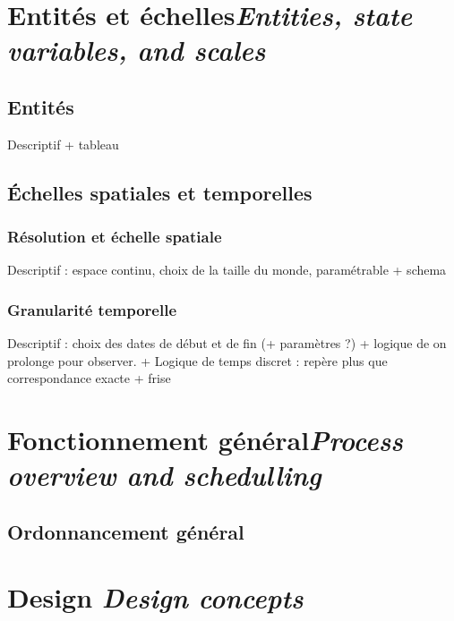 \section[Entités et échelles -- \textit{Entities, state variables, and scales}]{Entités et échelles\protect\newline \large{\textit{Entities, state variables, and scales}}}

\subsection{Entités}

Descriptif + tableau

\subsection{Échelles spatiales et temporelles}

\subsubsection{Résolution et échelle spatiale}

Descriptif : espace continu, choix de la taille du monde, paramétrable
+ schema

\subsubsection{Granularité temporelle}

Descriptif : choix des dates de début et de fin (+ paramètres ?) + logique de on prolonge pour observer. + Logique de temps discret : repère plus que correspondance exacte
+ frise

\section[Fonctionnement général -- \textit{Process overview and schedulling}]{Fonctionnement général\protect\newline \large{\textit{Process overview and schedulling}}}

\subsection{Ordonnancement général}


\section[Design -- \textit{Design concepts}]{Design \protect\newline \large{\textit{Design concepts}}}

